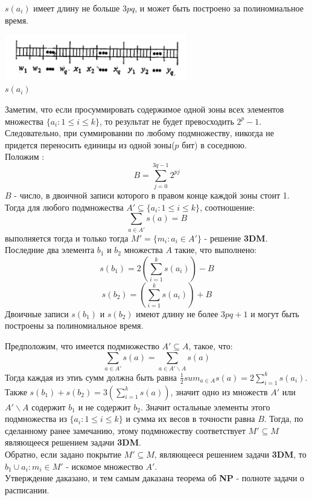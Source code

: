 \documentclass[10pt]{article}
\begin{document}
\begin{enumerate}
    $s(a_i)$ имеет длину не больше $3pq$, и может быть построено за полиномиальное время.
    \begin{center}
        \includegraphics[height=2cm]{img1.png} \\ $s(a_i)$
    \end{center}
    Заметим, что если просуммировать содержимое одной зоны всех элементов множества $\{a_i: 1 \leq i \leq k\}$, то результат не будет превосходить $2^p - 1$. Следовательно, при суммировании по любому подмножеству, никогда не придется переносить единицы из одной зоны($p$ бит) в соседнюю. \\
    Положим :
    \begin{equation}
        B = \sum^{3q-1}_{j=0} 2^{pj}
    \end{equation}
    $B$ - число, в двоичной записи которого в правом конце каждой зоны стоит 1. Тогда для любого подмножества 
    $A' \subseteq \{a_i: 1 \leq i \leq k\}$, соотношение: 
    \begin{equation}
        \sum_{a \in A'} s(a) = B
    \end{equation}
    выполняется тогда и только тогда $M' = \{m_i :a_i \in A'\}$ - решение \textbf{3DM}.
    Последние два элемента $b_1$ и $b_2$ множества $A$ такие, что выполнено:
    \begin{equation}
        s(b_1) = 2 \left( \sum^{k}_{i=1}s(a_i) \right) - B
    \end{equation}
    \begin{equation}
        s(b_2) = \left( \sum^{k}_{i=1}s(a_i) \right) + B
    \end{equation}
    Двоичные записи $s(b_1)$ и $s(b_2)$ имеют длину не более $3pq + 1$ и могут быть построены за полиномиальное время.

    Предположим, что имеется подмножество $A' \subseteq A$, такое, что: 
    \begin{equation}
        \sum_{a \in A'} s(a) = \sum_{a \in A' \backslash A} s(a)
    \end{equation}
    Тогда каждая из этиъ сумм должна быть равна $\frac{1}{2} sum_{a \in A} s(a) = 2 \sum^{k}_{i=1} s(a_i)$.
    Также $s(b_1) + s(b_2) = 3 \left(\sum^{k}_{i=1} s(a) \right)$, значит одно из множеств $A'$ или 
    $A' \backslash A$ содержит $b_1$ и не содержит $b_2$. Значит остальные элементы этого подмножества из $\{a_i: 1 \leq i \leq k \}$ и сумма их весов в точности равна $B$. Тогда, по сделанному ранее замечанию, этому подмножеству соответствует $M' \subseteq M$ являющееся решением задачи \textbf{3DM}. \\ 
    Обратно, если задано покрытие $M' \subseteq M$, являющееся решением задачи \textbf{3DM}, то ${b_1} \cup {a_i:m_i \in M'}$ - искомое множество $A'$. \\
    Утверждение даказано, и тем самым даказана теорема об \textbf{NP} - полноте задачи о расписании.




\end{enumerate}
\end{document}
